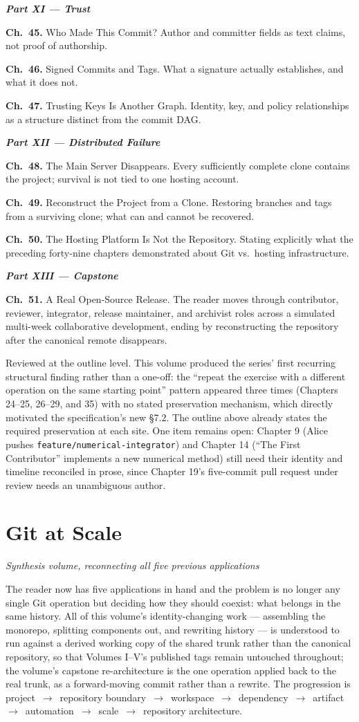 \documentclass[11pt]{book}
\newcommand{\subheading}[1]{\bigskip\noindent{\bfseries\itshape #1}\smallskip\par}
\newcommand{\chapentry}[2]{\noindent\textbf{Ch.~#1.} #2\par\smallskip}
\newcommand{\partheading}[1]{\bigskip\noindent\textbf{\textit{#1}}\smallskip\par}
\begin{document}
\partheading{Part XI --- Trust}
\chapentry{45}{Who Made This Commit? Author and committer fields as text claims, not proof of authorship.}
\chapentry{46}{Signed Commits and Tags. What a signature actually establishes, and what it does not.}
\chapentry{47}{Trusting Keys Is Another Graph. Identity, key, and policy relationships as a structure distinct from the commit DAG.}

\partheading{Part XII --- Distributed Failure}
\chapentry{48}{The Main Server Disappears. Every sufficiently complete clone contains the project; survival is not tied to one hosting account.}
\chapentry{49}{Reconstruct the Project from a Clone. Restoring branches and tags from a surviving clone; what can and cannot be recovered.}
\chapentry{50}{The Hosting Platform Is Not the Repository. Stating explicitly what the preceding forty-nine chapters demonstrated about Git vs.\ hosting infrastructure.}

\partheading{Part XIII --- Capstone}
\chapentry{51}{A Real Open-Source Release. The reader moves through contributor, reviewer, integrator, release maintainer, and archivist roles across a simulated multi-week collaborative development, ending by reconstructing the repository after the canonical remote disappears.}

\subheading{Status and Open Items}
Reviewed at the outline level. This volume produced the series' first recurring structural finding rather than a one-off: the ``repeat the exercise with a different operation on the same starting point'' pattern appeared three times (Chapters 24--25, 26--29, and 35) with no stated preservation mechanism, which directly motivated the specification's new \S7.2. The outline above already states the required preservation at each site. One item remains open: Chapter 9 (Alice pushes \texttt{feature/numerical-integrator}) and Chapter 14 (``The First Contributor'' implements a new numerical method) still need their identity and timeline reconciled in prose, since Chapter 19's five-commit pull request under review needs an unambiguous author.

\chapter{Git at Scale}
\textit{Synthesis volume, reconnecting all five previous applications}

\subheading{Governing Idea}
The reader now has five applications in hand and the problem is no longer any single Git operation but deciding how they should coexist: what belongs in the same history. All of this volume's identity-changing work --- assembling the monorepo, splitting components out, and rewriting history --- is understood to run against a derived working copy of the shared trunk rather than the canonical repository, so that Volumes I--V's published tags remain untouched throughout; the volume's capstone re-architecture is the one operation applied back to the real trunk, as a forward-moving commit rather than a rewrite. The progression is project~$\to$~repository boundary~$\to$~workspace~$\to$~dependency~$\to$~artifact~$\to$~automation~$\to$~scale~$\to$~repository architecture.
\end{document}
